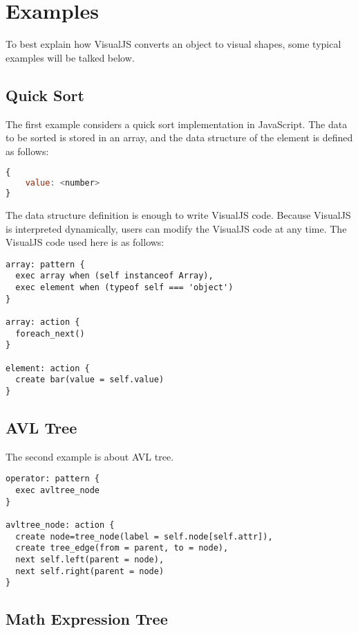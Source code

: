 \chapter {Examples}
\label {Examples}

To best explain how VisualJS converts an object to visual shapes, some typical examples will be talked below.

\section {Quick Sort}

The first example considers a quick sort implementation in JavaScript. The data to be sorted is stored in an array, and the data structure of the element is defined as follows:

\begin{lstlisting}[language=JavaScript]
{
	value: <number>
}
\end{lstlisting}

The data structure definition is enough to write VisualJS code. Because VisualJS is interpreted dynamically, users can modify the VisualJS code at any time. The VisualJS code used here is as follows:

\begin{lstlisting}
array: pattern {
  exec array when (self instanceof Array),
  exec element when (typeof self === 'object')
}

array: action {
  foreach_next()
}

element: action {
  create bar(value = self.value)
}
\end{lstlisting}

\section {AVL Tree}

The second example is about AVL tree.

\begin{lstlisting}
operator: pattern {
  exec avltree_node
}

avltree_node: action {
  create node=tree_node(label = self.node[self.attr]),
  create tree_edge(from = parent, to = node),
  next self.left(parent = node),
  next self.right(parent = node)
}
\end{lstlisting}

\section {Math Expression Tree}

